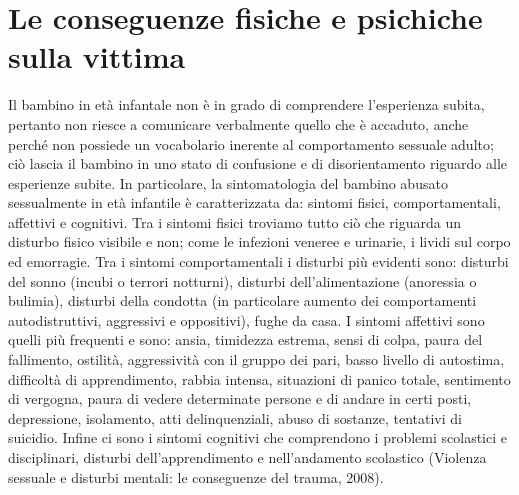 \section{Le conseguenze fisiche e psichiche sulla vittima}
Il bambino in età infantale non è in grado di comprendere l’esperienza subita, pertanto non riesce a comunicare verbalmente quello che è accaduto, anche perché non possiede un vocabolario inerente al comportamento sessuale adulto; ciò lascia il bambino in uno stato di confusione e di disorientamento riguardo alle esperienze subite. In particolare, la sintomatologia del bambino abusato sessualmente in età infantile è caratterizzata da: sintomi fisici, comportamentali, affettivi e cognitivi.
Tra i sintomi fisici troviamo tutto ciò che riguarda un disturbo fisico visibile e non; come le infezioni veneree e urinarie, i lividi sul corpo ed emorragie. Tra i sintomi comportamentali i disturbi più evidenti sono: disturbi del sonno (incubi o terrori notturni), disturbi dell’alimentazione (anoressia o bulimia), disturbi della condotta (in particolare aumento dei comportamenti autodistruttivi, aggressivi e oppositivi), fughe da casa. I sintomi affettivi sono quelli più frequenti e sono: ansia, timidezza estrema, sensi di colpa, paura del fallimento, ostilità, aggressività con il gruppo dei pari, basso livello di autostima, difficoltà di apprendimento, rabbia intensa, situazioni di panico totale, sentimento di vergogna, paura di vedere determinate persone e di andare in certi posti, depressione, isolamento, atti delinquenziali, abuso di sostanze, tentativi di suicidio. Infine ci sono i sintomi cognitivi che comprendono i problemi scolastici e disciplinari, disturbi dell’apprendimento e nell’andamento scolastico (Violenza sessuale e disturbi mentali: le conseguenze del trauma, 2008).
